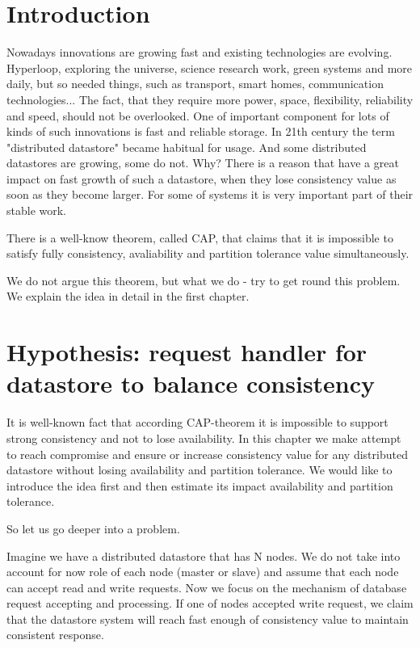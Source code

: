 \documentclass{report}
\begin{document}
\tableofcontents

\chapter*{Introduction}
Nowadays innovations are growing fast and existing technologies are evolving. Hyperloop, exploring the universe, science research work, green systems and more daily, but so needed things, such as transport, 
smart homes, communication technologies...
The fact, that they require more power, space, flexibility, reliability and speed, should not be overlooked. 
One of important component for lots of kinds of such innovations is fast and reliable storage. 
In 21th century the term "distributed datastore" became habitual for usage. And some distributed datastores
are growing, some do not. Why? There is a reason that have a great impact on fast growth of such a datastore,
when they lose consistency value as soon as they become larger. For some of systems it is very important
part of their stable work.

There is a well-know theorem, called CAP, that claims that it is impossible to satisfy fully consistency, avaliability and partition tolerance value simultaneously.

We do not argue this theorem, but what we do - try to get round this problem.
We explain the idea in detail in the first chapter.

\chapter{Hypothesis: request handler for datastore to balance consistency}

It is well-known fact that according CAP-theorem it is impossible to support strong consistency and not to lose availability. In this chapter we make attempt to reach compromise and ensure or increase consistency value for any distributed datastore without losing availability and partition tolerance.
We would like to introduce the idea first and then estimate its impact availability and partition tolerance.

So let us go deeper into a problem.

Imagine we have a distributed datastore that has N nodes. We do not take into account for now role of each node
(master or slave) and assume that each node can accept read and write requests. Now we focus on the mechanism
of database request accepting and processing. If one of nodes accepted write request, we claim that the
datastore system will reach fast enough of consistency value to maintain consistent response. 
\end{document}
